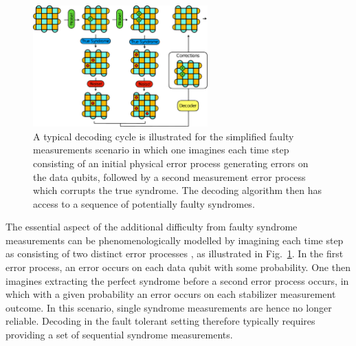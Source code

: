 \documentclass[twocolumn,preprintnumbers,amsmath,amssymb,notitlepage,nofootinbib,longbibliography,superscriptaddress,aps,pra,10pt]{revtex4-1}
\begin{document}
	\begin{figure}
	\centering
	\includegraphics[width=0.6\textwidth]{figures/decoding_problem.pdf}
	\caption{
		A typical decoding cycle is illustrated for the simplified faulty measurements scenario in which one imagines each time step consisting of an initial physical error process generating errors on the data qubits, followed by a second measurement error process which corrupts the true syndrome.
		The decoding algorithm then has access to a sequence of potentially faulty syndromes.}\label{f:decoding_problem}
	\end{figure}

	The essential aspect of the additional difficulty from faulty syndrome measurements can be phenomenologically modelled by imagining each time step as consisting of two distinct error processes \cite{stephens2014fault}, as illustrated in Fig.~\ref{f:decoding_problem}.
	In the first error process, an error occurs on each data qubit with some probability.
	One then imagines extracting the perfect syndrome before a second error process occurs, in which with a given probability an error occurs on each stabilizer measurement outcome.
	In this scenario, single syndrome measurements are hence no longer reliable.
	Decoding in the fault tolerant setting therefore typically requires providing a set of sequential syndrome measurements.
\end{document}

